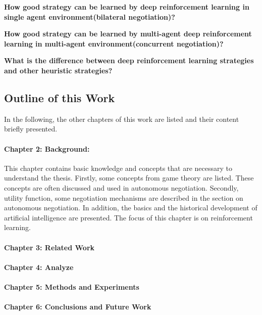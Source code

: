 \textbf{How good strategy can be learned by deep reinforcement learning in single agent environment(bilateral negotiation)?}

\textbf{How good strategy can be learned by multi-agent deep reinforcement learning in multi-agent environment(concurrent negotiation)?}

\textbf{What is the difference between deep reinforcement learning strategies and other heuristic strategies?}

\subsection{Outline of this Work}
In the following, the other chapters of this work are listed and their content briefly presented.

\paragraph{Chapter 2: Background:}
This chapter contains basic knowledge and concepts that are necessary to understand the thesis. Firstly, some concepts from game theory are listed. These concepts are often discussed and used in autonomous negotiation. Secondly, utility function, some negotiation mechanisms are described in the section on autonomous negotiation. In addition, the basics and the historical development of artificial intelligence are presented. The focus of this chapter is on reinforcement learning.

\paragraph{Chapter 3: Related Work}
\paragraph{Chapter 4: Analyze}
\paragraph{Chapter 5: Methods and Experiments}
\paragraph{Chapter 6: Conclusions and Future Work}